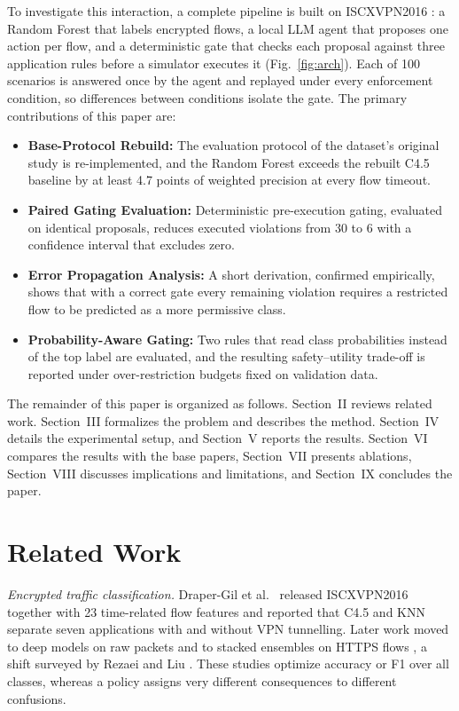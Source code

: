 \documentclass[conference,a4paper]{IEEEtran}
\begin{document}
To investigate this interaction, a complete pipeline is built on ISCXVPN2016 \cite{drapergil2016}: a Random Forest that labels encrypted flows, a local LLM agent that proposes one action per flow, and a deterministic gate that checks each proposal against three application rules before a simulator executes it (Fig.~\ref{fig:arch}). Each of 100 scenarios is answered once by the agent and replayed under every enforcement condition, so differences between conditions isolate the gate. The primary contributions of this paper are:
\begin{itemize}
\item \textbf{Base-Protocol Rebuild:} The evaluation protocol of the dataset's original study is re-implemented, and the Random Forest exceeds the rebuilt C4.5 baseline by at least 4.7 points of weighted precision at every flow timeout.
\item \textbf{Paired Gating Evaluation:} Deterministic pre-execution gating, evaluated on identical proposals, reduces executed violations from 30 to 6 with a confidence interval that excludes zero.
\item \textbf{Error Propagation Analysis:} A short derivation, confirmed empirically, shows that with a correct gate every remaining violation requires a restricted flow to be predicted as a more permissive class.
\item \textbf{Probability-Aware Gating:} Two rules that read class probabilities instead of the top label are evaluated, and the resulting safety--utility trade-off is reported under over-restriction budgets fixed on validation data.
\end{itemize}

The remainder of this paper is organized as follows. Section~II reviews related work. Section~III formalizes the problem and describes the method. Section~IV details the experimental setup, and Section~V reports the results. Section~VI compares the results with the base papers, Section~VII presents ablations, Section~VIII discusses implications and limitations, and Section~IX concludes the paper.

\section{Related Work}

\textit{Encrypted traffic classification.} Draper-Gil et al.~\cite{drapergil2016} released ISCXVPN2016 together with 23 time-related flow features and reported that C4.5 and KNN separate seven applications with and without VPN tunnelling. Later work moved to deep models on raw packets \cite{lotfollahi2020} and to stacked ensembles on HTTPS flows \cite{elshewey2025}, a shift surveyed by Rezaei and Liu \cite{rezaei2019}. These studies optimize accuracy or F1 over all classes, whereas a policy assigns very different consequences to different confusions.
\end{document}
